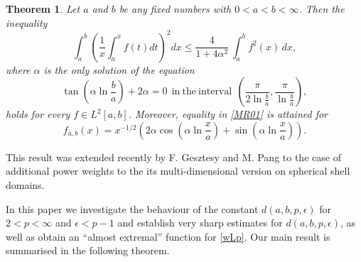 \documentclass[10pt,a4paper]{amsart}
\newtheorem{theorem}{Theorem}[section]
\numberwithin{equation}{section}
\begin{document}
\begin{theorem}\cite{DGM}\label{th01}
Let  $a$ and $b$ be any fixed numbers with $0<a<b<\infty$. Then the inequality
\begin{equation}\label{MR01}
\int_a^b\left(\frac{1}{x}\int_a^xf(t)dt\right)^2 dx\leq
\frac{4}{1+4\alpha^2}\,\int_a^bf^2(x)\, dx,
\end{equation}
where $\alpha$ is the only solution of the equation
$$
\tan\left(\alpha\ln\frac{b}{a} \right)+2\alpha=0\ \ \mathrm{in\ the\ interval}\ \ \left(\frac{\pi}{2\ln\frac{b}{a}},\frac{\pi}{\ln\frac{b}{a}} \right),
$$
holds for every $f \in L^2[a,b]$.
Moreover, equality in \eqref{MR01} is attained for 
\[
f_{a,b}(x)=x^{-1/2}\left(2\alpha\cos\left(\alpha\ln \frac{x}{a}\right)+\sin\left(\alpha\ln  \frac{x}{a}\right) \right).
\]
\end{theorem}

This result was extended recently by F. Gesztesy and M. Pang \cite{GP} to the case of
additional power weights to the its multi-dimensional version on spherical shell domains.




 In this paper we investigate the behaviour of the constant $d(a,b,p,\epsilon)$  for $2< p<\infty$ and $\epsilon< p-1$ and  establish very sharp estimates for $d(a,b,p,\epsilon)$, as well as obtain an ``almost extremal'' function for \eqref{wLp}. Our main result is summarised in the following theorem.  
\end{document}
